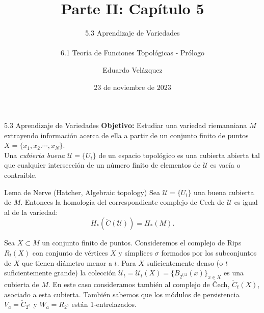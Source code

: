 \documentclass{beamer}
\date{23 de noviembre de 2023}%
\title{Parte II: Cap\'itulo 5}
\subtitle{5.3 Aprendizaje de Variedades\\ \scalebox{0.6}{\emph{(Manifold learning)}}\\ 6.1 Teor\'ia de Funciones Topol\'ogicas - Pr\'ologo\\ \scalebox{0.6}{\emph{(Topological function theory - Prologue)}}}
\author{Eduardo Vel\'azquez}
\begin{document}
\frenchspacing


  \frame{\maketitle}


%
\begin{frame}{5.3 Aprendizaje de Variedades}{}
{\bfseries Objetivo:} Estudiar una variedad riemanniana $M$ extrayendo información acerca de ella a partir de un conjunto finito de puntos $X=\{x_1,x_2.\cdots,x_N\}$.\\
$\,$\\
Una \emph{cubierta buena} $\mathcal{U}=\{U_i\}$ de un espacio topol\'ogico es una cubierta abierta tal que cualquier intersecci\'on de un n\'umero finito de elementos de $\mathcal{U}$ es vac\'ia o contraible.\\
$\,$\\
\begin{lemma}{Lema de Nerve (Hatcher, Algebraic topology)} Sea $\mathcal{U}=\{U_i\}$ una buena cubierta de $M$. Entonces la homolog\'ia del correspondiente complejo de Cech de $\mathcal{U}$ es igual al de la variedad: 
$$H_\ast\left(\check{C}\left( \mathcal{U}\right)\right)=H_\ast\left( M\right).$$
\end{lemma}
\end{frame}


\begin{frame}
Sea $X\subset M$ un conjunto finito de puntos. Consideremos el complejo de Rips $R_t(X)$ con conjunto de v\'ertices $X$ y s\'implices $\sigma$ formados por los subconjuntos de $X$ que tienen di\'ametro menor a $t$. Para $X$ suficientemente denso (o $t$ suficientemente grande) la colecci\'on $\mathcal{U}_t=\mathcal{U}_t(X)=\{B_{2^{t/2}}(x)\}_{x\in X}$ es una cubierta de $M$. En este caso consideramos tambi\'en al complejo de \v{C}ech, $\check{C}_t(X)$, asociado a esta cubierta. Tambi\'en sabemos que los m\'odulos de persistencia $V_a=\check{C}_{2^a}$ y $W_a=R_{2^a}$ est\'an 1-entrelazados.
\end{frame}
\end{document}
